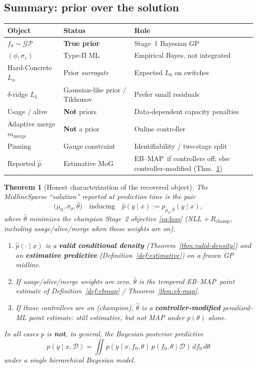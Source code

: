 \documentclass[11pt,a4paper]{article}
\theoremstyle{plain}
\newtheorem{theorem}{Theorem}[section]
\theoremstyle{definition}
\theoremstyle{remark}
\newcommand{\GP}{\mathcal{GP}}
\newcommand{\D}{\mathcal{D}}
\newcommand{\tht}{\theta}
\newcommand{\EBMAP}{EB--MAP}
\begin{document}
\subsection{Summary: prior over the solution}
\begin{center}
\begin{tabular}{@{}llp{6.6cm}@{}}
\toprule
Object & Status & Role \\
\midrule
\(f_0\sim\GP\) & \textbf{True prior} & Stage~1 Bayesian GP \\
\((\phi,\sigma_\varepsilon)\) & Type-II ML & Empirical Bayes, not integrated \\
Hard-Concrete \(L_\alpha\) & Prior \emph{surrogate} & Expected \(L_0\) on switches \\
\(\delta\)-ridge \(L_\delta\) & Gaussian-like prior / Tikhonov & Prefer small residuals \\
Usage / alive & \textbf{Not} priors & Data-dependent capacity penalties \\
Adaptive merge \(m_{\mathrm{merge}}\) & \textbf{Not} a prior & Online controller \\
Pinning & Gauge constraint & Identifiability / two-stage split \\
Reported \(\hat p\) & Estimative MoG & \EBMAP\ if controllers off; else controller-modified (Thm.~\ref{thm:honest}) \\
\bottomrule
\end{tabular}
\end{center}

\begin{theorem}[Honest characterization of the recovered object]
\label{thm:honest}
The MidlineSparse ``solution'' reported at prediction time is the pair
\[
  \bigl(\mu_0,\sigma_0,\hat\tht\bigr)
  \quad\text{inducing}\quad
  \hat p(y\mid x)
  :=
  p_{\mu_0,\hat\tht}(y\mid x),
\]
where \(\hat\tht\) minimizes the champion Stage~2 objective \eqref{eq:loss}
(NLL \(+\,R_{\mathrm{champ}}\), including usage/alive/merge when those weights are on).
\begin{enumerate}[label=(\roman*)]
  \item \(\hat p(\cdot\mid x)\) is a \textbf{valid conditional density}
        (Theorem~\ref{thm:valid-density}) and an \textbf{estimative predictive}
        (Definition~\ref{def:estimative}) on a frozen GP midline.
  \item If usage/alive/merge weights are zero, \(\hat\tht\) is the tempered
        \EBMAP\ point estimate of Definition~\ref{def:ebmap} /
        Theorem~\ref{thm:eb-map}.
  \item If those controllers are on (champion), \(\hat\tht\) is a
        \textbf{controller-modified} penalized-ML point estimate: still estimative,
        but \emph{not} MAP under \(p(\tht)\) alone.
\end{enumerate}
In all cases \(\hat p\) is \textbf{not}, in general, the Bayesian posterior predictive
\[
  p(y\mid x,\D)
  =
  \iint
  p(y\mid x,f_0,\tht)\,
  p(f_0,\tht\mid\D)\,
  df_0\,d\tht
\]
under a single hierarchical Bayesian model.
\end{theorem}
\end{document}
